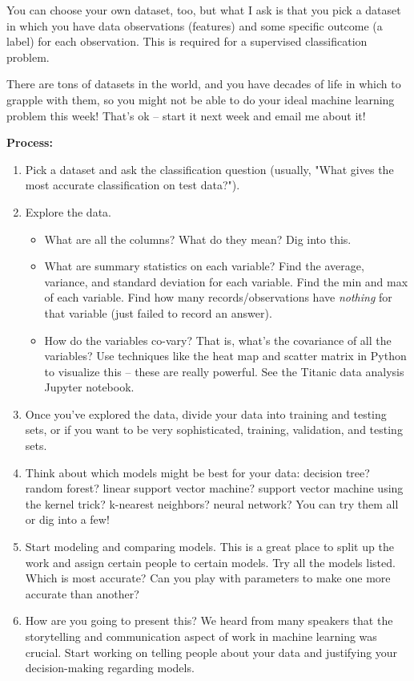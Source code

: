 \documentclass[10pt]{article}
\begin{document}
You can choose your own dataset, too, but what I ask is that you pick a dataset in which you have data observations (features) and some specific outcome (a label) for each observation. This is required for a supervised classification problem.

There are tons of datasets in the world, and you have decades of life in which to grapple with them, so you might not be able to do your ideal machine learning problem this week! That's ok -- start it next week and email me about it!

\bigskip

\textbf{Process:}
\begin{enumerate}
\item Pick a dataset and ask the classification question (usually, "What gives the most accurate classification on test data?"). 
\item Explore the data. 
\begin{itemize}
\item What are all the columns? What do they mean? Dig into this.
\item What are summary statistics on each variable? Find the average, variance, and standard deviation for each variable. Find the min and max of each variable. Find how many records/observations have \textit{nothing} for that variable (just failed to record an answer).
\item How do the variables co-vary? That is, what's the covariance of all the variables? Use techniques like the heat map and scatter matrix in Python to visualize this -- these are really powerful. See the Titanic data analysis Jupyter notebook.
\end{itemize}
\item Once you've explored the data, divide your data into training and testing sets, or if you want to be very sophisticated, training, validation, and testing sets.
\item Think about which models might be best for your data: decision tree? random forest? linear support vector machine? support vector machine using the kernel trick? k-nearest neighbors? neural network? You can try them all or dig into a few!
\item Start modeling and comparing models. This is a great place to split up the work and assign certain people to certain models. Try all the models listed. Which is most accurate? Can you play with parameters to make one more accurate than another?
\item How are you going to present this? We heard from many speakers that the storytelling and communication aspect of work in machine learning was crucial. Start working on telling people about your data and justifying your decision-making regarding models. 
\end{enumerate}
\end{document}
